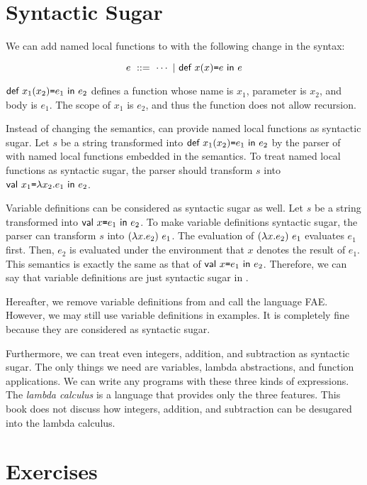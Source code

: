 \section{Syntactic Sugar}

We can add named local functions to \lang with the following change in the
syntax:

\[
  e\ ::=\ \cdots\ |\ \erec{x}{x}{e}{e}
\]

$\textsf{def}\ x_1(x_2)\texttt{=} e_1\ \textsf{in}\ e_2$ defines a function whose name is $x_1$, parameter is
$x_2$, and body is $e_1$. The scope of $x_1$ is $e_2$, and thus the function
does not allow recursion.

Instead of changing the semantics, \lang can provide named local functions as
syntactic sugar. Let $s$ be a string transformed into $\textsf{def}\ x_1(x_2)\texttt{=} e_1\ \textsf{in}\ e_2$
by the parser of \lang with named local functions embedded in the semantics.
To treat named local functions as syntactic sugar, the parser should transform
$s$ into $\textsf{val}\ x_1\texttt{=}\lambda x_2.e_1\ \textsf{in}\ e_2$.

Variable definitions can be considered as syntactic sugar as well.
Let $s$ be a string transformed into $\textsf{val}\ x\texttt{=} e_1\ \textsf{in}\ e_2$.
To make variable definitions syntactic sugar, the parser can transform $s$ into
$(\lambda x.e_2)\ e_1$. The evaluation of $(\lambda x.e_2)\ e_1$
evaluates $e_1$ first. Then, $e_2$ is evaluated under the environment that $x$ denotes
the result of $e_1$. This semantics is exactly the same as that of
$\textsf{val}\ x\texttt{=} e_1\ \textsf{in}\ e_2$. Therefore, we can say that variable definitions are just
syntactic sugar in \lang.

Hereafter, we remove variable definitions from \lang and call the language
\textsf{FAE}. However, we may still use variable definitions in examples. It is
completely fine because they are considered as syntactic sugar.

Furthermore, we can treat even integers, addition, and subtraction as syntactic
sugar. The only things we need are variables, lambda abstractions, and function
applications. We can write any programs with these three kinds of expressions.
The \textit{lambda calculus} is a language that provides
only the three features. This book does not discuss how integers, addition, and
subtraction can be desugared into the lambda calculus.

\section{Exercises}

